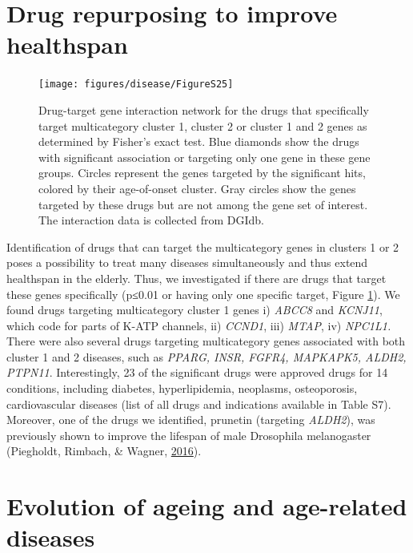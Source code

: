 \documentclass[12pt,twoside]{unicam}
\begin{document}
\hypertarget{drug-repurposing-to-improve-healthspan}{%
\section{Drug repurposing to improve healthspan}\label{drug-repurposing-to-improve-healthspan}}

\begin{figure}

{\centering \texttt{[image: figures/disease/FigureS25]} 

}

\caption[Drug-target gene interaction network for the drugs specific to multicategory age-dependent diseases.]{Drug-target gene interaction network for the drugs that specifically target multicategory cluster 1, cluster 2 or cluster 1 and 2 genes as determined by Fisher’s exact test. Blue diamonds show the drugs with significant association or targeting only one gene in these gene groups. Circles represent the genes targeted by the significant hits, colored by their age-of-onset cluster. Gray circles show the genes targeted by these drugs but are not among the gene set of interest. The interaction data is collected from DGIdb.}\label{fig:disFigS25}
\end{figure}

Identification of drugs that can target the multicategory genes in clusters 1 or 2 poses a possibility to treat many diseases simultaneously and thus extend healthspan in the elderly. Thus, we investigated if there are drugs that target these genes specifically (p≤0.01 or having only one specific target, Figure \ref{fig:disFigS25}). We found drugs targeting multicategory cluster 1 genes i) \emph{ABCC8} and \emph{KCNJ11}, which code for parts of K-ATP channels, ii) \emph{CCND1}, iii) \emph{MTAP}, iv) \emph{NPC1L1.} There were also several drugs targeting multicategory genes associated with both cluster 1 and 2 diseases, such as \emph{PPARG, INSR, FGFR4, MAPKAPK5, ALDH2, PTPN11}. Interestingly, 23 of the significant drugs were approved drugs for 14 conditions, including diabetes, hyperlipidemia, neoplasms, osteoporosis, cardiovascular diseases (list of all drugs and indications available in Table S7). Moreover, one of the drugs we identified, prunetin (targeting \emph{ALDH2}), was previously shown to improve the lifespan of male Drosophila melanogaster (Piegholdt, Rimbach, \& Wagner, \protect\hyperlink{ref-Piegholdt2016}{2016}).

\hypertarget{evolution-of-ageing-and-age-related-diseases}{%
\section{Evolution of ageing and age-related diseases}\label{evolution-of-ageing-and-age-related-diseases}}
\end{document}
